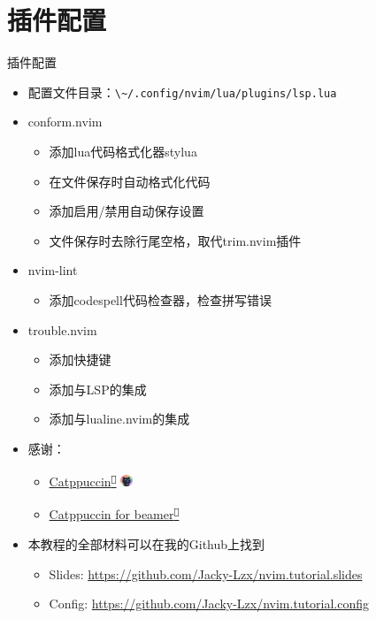 \documentclass[aspectratio=169]{ctexbeamer}
\newcommand{\nerd}[1]{\texttt{#1}}
\newcommand{\link}[3][]{\href{#3}{#2\textsuperscript{\nerd{}}}}
\begin{document}
\section{插件配置}

  \begin{frame}{插件配置}
    \begin{itemize}
      \item 配置文件目录：\lstinline[language={}, style=path]{\~/.config/nvim/lua/plugins/lsp.lua}
      \item conform.nvim
        \begin{itemize}
          \item 添加lua代码格式化器stylua
          \item 在文件保存时自动格式化代码
          \item 添加启用/禁用自动保存设置
          \item 文件保存时去除行尾空格，取代trim.nvim插件
        \end{itemize}
      \item nvim-lint
        \begin{itemize}
          \item 添加codespell代码检查器，检查拼写错误
        \end{itemize}
      \item trouble.nvim
        \begin{itemize}
          \item 添加快捷键
          \item 添加与LSP的集成
          \item 添加与lualine.nvim的集成
        \end{itemize}
    \end{itemize}

  \end{frame}

  \begin{frame}
    \begin{itemize}
      \item 感谢：
        \begin{itemize}
          \item \link{Catppuccin}{https://catppuccin.com/} \includegraphics[height=10pt]{./Figures/Catppuccin_logo.png}
          \item \link{Catppuccin for beamer}{https://github.com/atticus-sullivan/beamercolortheme}
        \end{itemize}
        \vspace{0.5cm}
      \item 本教程的全部材料可以在我的Github上找到
        \begin{itemize}
          \item Slides: \url{https://github.com/Jacky-Lzx/nvim.tutorial.slides}
          \item Config: \url{https://github.com/Jacky-Lzx/nvim.tutorial.config}
        \end{itemize}
    \end{itemize}
  \end{frame}
\end{document}
